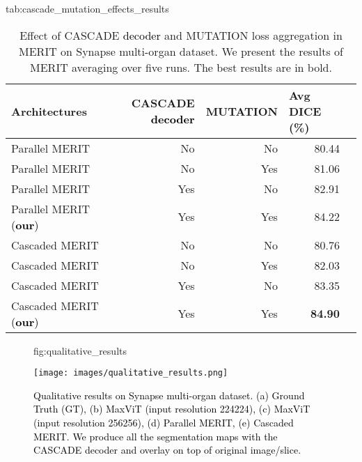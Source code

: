 \documentclass{midl}
\begin{document}
\begin{table*}[t]
\centering
\floatconts
{tab:cascade_mutation_effects_results}
{\caption{Effect of CASCADE \textcolor{black}{decoder} and MUTATION loss aggregation in MERIT on Synapse multi-organ dataset. We present the results of MERIT averaging over five runs. The best results are in bold.}} {{\vspace{-0.4cm}\begin{tabular}{lrrrr}
\toprule
Architectures    &  CASCADE \textcolor{black}{decoder}   &  MUTATION     & \multicolumn{1}{l}{Avg DICE (\%)} \\
\midrule
Parallel MERIT            &  No         & No    & 80.44  \\
Parallel MERIT           & No         & Yes                   & 81.06   \\
Parallel MERIT            &  Yes         & No            & 82.91  \\
Parallel MERIT \textcolor{black}{(\textbf{our})}          & Yes       & Yes                     & 84.22   \\
\midrule
Cascaded MERIT            &  No         & No    & 80.76  \\
Cascaded MERIT           & No         & Yes                   & 82.03   \\
Cascaded MERIT            &  Yes         & No            & 83.35  \\
Cascaded MERIT \textcolor{black}{(\textbf{our})}           & Yes       & Yes                     & \textbf{84.90}    \\
\bottomrule \end{tabular}}
}\end{table*}

\begin{figure}[t]\floatconts
  {fig:qualitative_results}
  {\caption{\textcolor{black}{Qualitative results on Synapse multi-organ dataset. (a) Ground Truth (GT), (b) MaxViT (input resolution 224224), (c) MaxViT (input resolution 256256), (d) Parallel MERIT, (e) Cascaded MERIT. We produce all the segmentation maps with the CASCADE decoder and overlay on top of original image/slice.}}}
  {\texttt{[image: images/qualitative\_results.png]}}
\end{figure}
\end{document}
